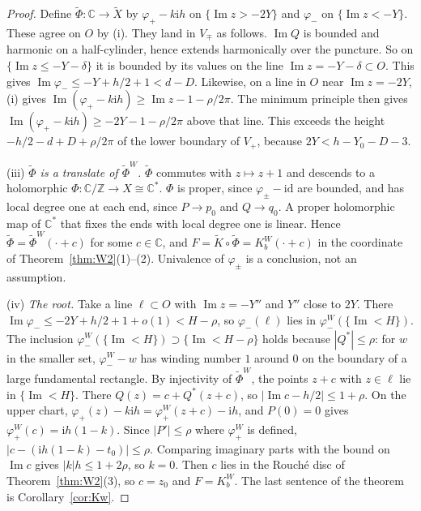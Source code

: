 \documentclass[11pt,a4paper]{article}
\theoremstyle{definition}
\newcommand{\Kk}{K}
\newcommand{\ii}{\mathrm{i}}
\begin{document}
\begin{proof}
Define $\tilde\Phi:\mathbb C\to\tilde X$ by $\varphi_+-k\ii h$ on
$\{\operatorname{Im}z>-2Y\}$ and $\varphi_-$ on $\{\operatorname{Im}z<-Y\}$.
These agree on $O$ by (i).  They land in $V_\mp$ as follows.
$\operatorname{Im}Q$ is bounded and harmonic on a half-cylinder, hence extends
harmonically over the puncture.  So on $\{\operatorname{Im}z\le-Y-\delta\}$ it is
bounded by its values on the line $\operatorname{Im}z=-Y-\delta\subset O$.
This gives $\operatorname{Im}\varphi_-\le-Y+h/2+1<d-D$.  Likewise, on a line
in $O$ near $\operatorname{Im}z=-2Y$, (i) gives
$\operatorname{Im}(\varphi_+-k\ii h)\ge\operatorname{Im}z-1-\rho/2\pi$.  The minimum
principle then gives $\operatorname{Im}(\varphi_+-k\ii h)\ge-2Y-1-\rho/2\pi$
above that line.  This exceeds the height
$-h/2-d+D+\rho/2\pi$ of the lower boundary of $V_+$, because
$2Y<h-Y_0-D-3$.

(iii) \emph{$\tilde\Phi$ is a translate of $\tilde\Phi^W$.}  $\tilde\Phi$
commutes with $z\mapsto z+1$ and descends to a holomorphic
$\Phi:\mathbb C/\mathbb Z\to X\cong\mathbb C^*$.  $\Phi$ is proper, since
$\varphi_\pm-\mathrm{id}$ are bounded, and has local degree one at each end,
since $P\to p_0$ and $Q\to q_0$.  A proper holomorphic map of $\mathbb C^*$ that
fixes the ends with local degree one is linear.  Hence
$\tilde\Phi=\tilde\Phi^W(\cdot+c)$ for some $c\in\mathbb C$, and
$F=\tilde K\circ\tilde\Phi=\Kk^W_b(\cdot+c)$ in the coordinate of
Theorem~\ref{thm:W2}(1)--(2).  Univalence of $\varphi_\pm$ is a conclusion, not
an assumption.

(iv) \emph{The root.}  Take a line $\ell\subset O$ with
$\operatorname{Im}z=-Y''$ and $Y''$ close to $2Y$.  There
$\operatorname{Im}\varphi_-\le-2Y+h/2+1+o(1)<H-\rho$, so $\varphi_-(\ell)$ lies
in $\varphi_-^W(\{\operatorname{Im}<H\})$.  The inclusion
$\varphi_-^W(\{\operatorname{Im}<H\})\supset\{\operatorname{Im}<H-\rho\}$ holds because
$|Q^*|\le\rho$: for $w$ in the smaller set, $\varphi^W_--w$ has winding
number $1$ around $0$ on the boundary of a large fundamental rectangle.  By injectivity of
$\tilde\Phi^W$, the points $z+c$ with $z\in\ell$ lie in
$\{\operatorname{Im}<H\}$.  There $Q(z)=c+Q^*(z+c)$, so
$|\operatorname{Im}c-h/2|\le1+\rho$.  On the upper chart,
$\varphi_+(z)-k\ii h=\varphi^W_+(z+c)-\ii h$, and $P(0)=0$ gives
$\varphi^W_+(c)=\ii h(1-k)$.  Since $|P'|\le\rho$ where $\varphi^W_+$ is defined,
$|c-(\ii h(1-k)-t_0)|\le\rho$.  Comparing imaginary parts with the bound on
$\operatorname{Im}c$ gives $|k|h\le1+2\rho$, so $k=0$.  Then $c$ lies in the
Rouch\'e disc of Theorem~\ref{thm:W2}(3), so $c=z_0$ and $F=\Kk^W_b$.  The last
sentence of the theorem is Corollary~\ref{cor:Kw}.
\end{proof}
\end{document}
